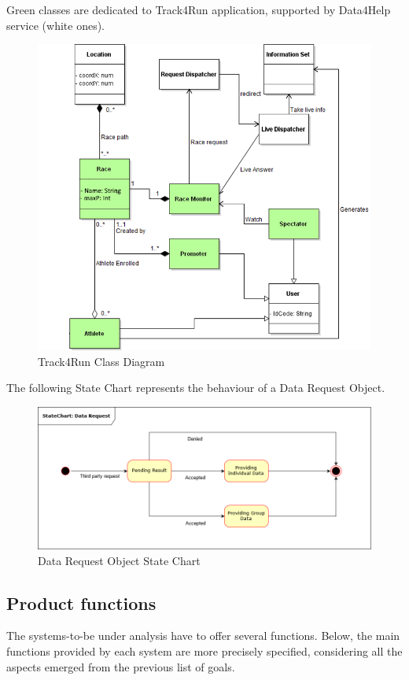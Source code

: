 \begin{minipage}{\textwidth}
{\color{LimeGreen} Green classes} are dedicated to {\color{LimeGreen} Track4Run} application, supported by Data4Help service (white ones).
\begin{figure}[H]
\includegraphics[scale=0.7]{Images/Class_Track4Run.png}
\caption{Track4Run Class Diagram}
\end{figure}
The following State Chart represents the behaviour of a Data Request Object.
\begin{figure}[H]
\includegraphics[scale=0.5]{Images/StateChart.png}
\caption{Data Request Object State Chart}
\end{figure}
\end{minipage}

\subsection{Product functions}
The systems-to-be under analysis have to offer several functions. Below, the main functions provided by each system are more precisely specified, considering all the aspects emerged from the previous list of goals.
